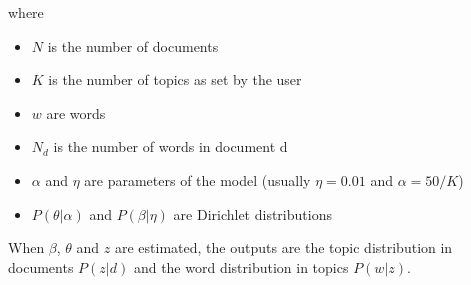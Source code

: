 where
\begin{itemize}
	\item $N$ is the number of documents
	\item $K$ is the number of topics as set by the user
	\item $w$ are words
	\item $N_d$ is the number of words in document d
	\item $\alpha$ and $\eta$ are parameters of the model (usually $\eta=0.01$ and $\alpha=50/K$)
	\item $P(\theta | \alpha)$ and $P(\beta|\eta)$ are Dirichlet distributions
\end{itemize}
When $\beta$, $\theta$ and $z$ are estimated, the outputs are the topic distribution in documents $P(z|d)$ and the word distribution in topics $P(w|z)$.